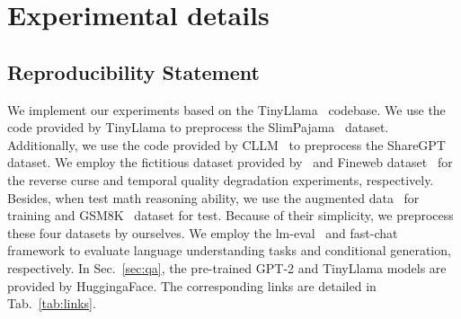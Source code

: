 \documentclass{article} %
\begin{document}
\section{Experimental details}
\label{app:sec_all_details}
\subsection{Reproducibility Statement}
\label{app:reproducibility}
We implement our experiments based on the TinyLlama~\citep{zhang2024tinyllama} codebase. We use the code provided by TinyLlama to preprocess the SlimPajama~\citep{cerebras2023slimpajama} dataset. Additionally, we use the code provided by CLLM~\citep{kou2024cllms} to preprocess the ShareGPT dataset. We employ the fictitious dataset provided by~\cite{berglund2023reversal} and Fineweb dataset~\citep{penedo2024finewebdatasetsdecantingweb} for the reverse curse and temporal quality degradation experiments, respectively. Besides, when test math reasoning ability, we use the augmented data~\citep{deng2023implicit} for training and GSM8K~\citep{cobbe2021training} dataset for test. Because of their simplicity, we preprocess these four datasets by ourselves. We employ the lm-eval~\citep{eval-harness} and fast-chat~\citep{zheng2023judging} framework to evaluate language understanding tasks and conditional generation, respectively. In Sec.~\ref{sec:qa},  the pre-trained GPT-2 and TinyLlama models are provided by HuggingaFace. The corresponding links are detailed in Tab.~\ref{tab:links}.
\end{document}
